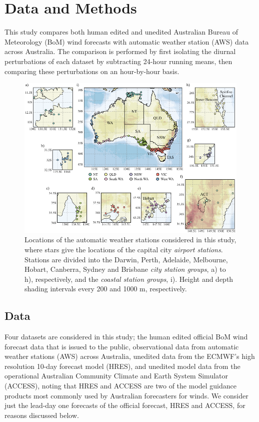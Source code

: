 \documentclass{ametsoc}
\begin{document}
\section{Data and Methods} \label{Sec:Methods}
This study compares both human edited and unedited Australian Bureau of Meteorology (BoM) wind forecasts with automatic weather station (AWS) data across Australia. The comparison is performed by first isolating the diurnal perturbations of each dataset by subtracting 24-hour running means, then comparing these perturbations on an hour-by-hour basis.

\begin{figure}
\centering
\includegraphics[width=39pc]{map.pdf}
\caption{Locations of the automatic weather stations considered in this study, where stars give the locations of the capital city \textit{airport stations}. Stations are divided into the Darwin, Perth, Adelaide, Melbourne, Hobart, Canberra, Sydney and Brisbane \textit{city station groups}, a) to h), respectively, and the \textit{coastal station groups}, i).  Height and depth shading intervals every 200 and 1000 m, respectively.}
\label{Fig:map}
\end{figure}

\subsection{Data}
Four datasets are considered in this study; the human edited official BoM wind forecast data that is issued to the public, observational data from automatic weather stations (AWS) across Australia, unedited data from the ECMWF's high resolution 10-day forecast model (HRES), and unedited model data from the operational Australian Community Climate and Earth System Simulator (ACCESS), noting that HRES and ACCESS are two of the model guidance products most commonly used by Australian forecasters for winds. We consider just the lead-day one forecasts of the official forecast, HRES and ACCESS, for reasons discussed below. 
\end{document}
